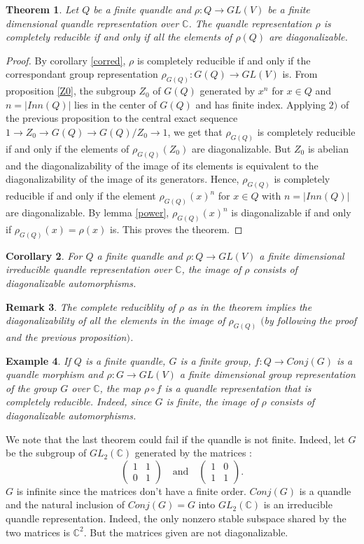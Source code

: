 \documentclass[12pt, reqno]{amsart}
\newtheorem{theorem}{Theorem}[section]
\newtheorem{corollary}[theorem]{Corollary}
\newtheorem{remark}[theorem]{Remark}
\newtheorem{example}[theorem]{Example}
\begin{document}
\begin{theorem}
Let $Q$ be a finite quandle and $\rho :Q \to GL(V)$ be a finite dimensional quandle representation over $\mathbb{C}$. The quandle representation $\rho$ is completely reducible if and only if all the elements of $\rho(Q)$ are diagonalizable.
\end{theorem}
\begin{proof}
By corollary \ref{corred}, $\rho$ is completely reducible if and only if the correspondant group representation  $\rho_{G(Q)}:G(Q)\to GL(V)$ is. From proposition \ref{Z0}, the subgroup $Z_0$ of $G(Q)$ generated by $x^n$ for $x\in Q$ and $n=\vert Inn(Q)\vert$ lies in the center of $G(Q)$ and has finite index. Applying $2)$ of the previous proposition to the central exact sequence $1\to Z_0\to G(Q) \to G(Q)/Z_0 \to 1$, we get that $\rho_{G(Q)}$ is completely reducible if and only if the elements of $\rho_{G(Q)}(Z_0)$ are diagonalizable. But $Z_0$ is abelian and the diagonalizability of the image of its elements is equivalent to the diagonalizability of the image of its generators. Hence, $\rho_{G(Q)}$ is completely reducible if and only if the element $\rho_{G(Q)}(x)^n$ for $x\in Q$ with $n=\vert Inn(Q) \vert $ are diagonalizable. By lemma \ref{power}, $\rho_{G(Q)}(x)^n$ is diagonalizable if and only if $\rho_{G(Q)}(x)=\rho(x)$ is. This proves the theorem.
\end{proof}
\begin{corollary}
For $Q$ a finite quandle and $\rho : Q \to GL(V)$ a finite dimensional irreducible quandle representation over $\mathbb{C}$, the image of $\rho$ consists of diagonalizable automorphisms.
\end{corollary}
\begin{remark}
The complete reduciblity of $\rho$ as in the theorem implies the diagonalizability of all the elements in the image of $\rho_{G(Q)}$ $($by following the proof and the previous proposition$)$.
\end{remark}
\begin{example}
If $Q$ is a finite quandle, $G$ is a finite group, $f:Q\to Conj(G)$ is a quandle morphism and $\rho :G\to GL(V)$ a finite dimensional group representation of the group $G$ over $\mathbb{C}$, the map $\rho \circ f$ is a quandle representation that is completely reducible. Indeed, since $G$ is finite, the image of $\rho$ consists of diagonalizable automorphisms.
\end{example}
We note that the last theorem could fail if the quandle is not finite. Indeed, let $G$ be the subgroup of $GL_2(\mathbb{C})$ generated by the matrices :
\[\begin{pmatrix}
1 & 1\\
0 & 1
\end{pmatrix}\quad \text{and} \quad \begin{pmatrix}
1 & 0\\
1& 1
\end{pmatrix}.\]
$G$ is infinite since the matrices don't have a finite order. $Conj(G)$ is a quandle and the natural inclusion of $Conj(G)=G$ into $GL_2(\mathbb{C})$ is an irreducible quandle representation. Indeed, the only nonzero stable subspace shared by the two matrices is $\mathbb{C}^2$. But the matrices given are not diagonalizable. 
\end{document}
